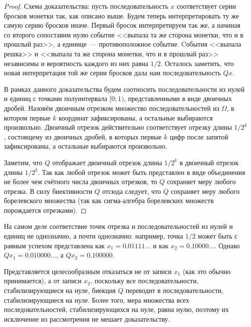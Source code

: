 \begin{proof}
	Схема доказательства:
	пусть последовательность $x$ соответствует серии бросков монетки так, как описано выше.
	Будем теперь интерпретировать ту же самую серию бросков иначе.
	Первый бросок интерпретируем так же,
	а начиная со второго сопоставим нулю событие <<выпала та же сторона монетки, что и в прошлый раз>>,
	а единице~--- противоположное событие.
	Cобытия <<выпала решка>> и <<выпала та же сторона монетки, что и в прошлый раз>> независимы
	и вероятность каждого из них равна $1/2$.
	Осталось заметить, что новая интерпретация той же серии бросков дала нам последовательность $Qx$.

	В рамках данного доказательства будем соотносить последовательности из нулей и единиц
	с точками полуинтервала $[0;1)$, представленными в виде двоичных дробей.
	Назовём двоичным отрезком множество последовательностей из $\Omega$,
	в котором первые $k$ координат зафиксированы, а остальные выбираются произвольно.
	Двоичный отрезок действительно соответствует отрезку длины $1/2^k$,
	состоящему из двоичных дробей, в которых первые $k$ цифр после запятой зафиксированы,
	а остальные выбираются произвольно.

	Заметим, что $Q$ отображает двоичный отрезок длины $1/2^k$ в двоичный отрезок длины $1/2^k$.
	Так как любой отрезок может быть представлен в виде объединения не более чем счётного числа
	двоичных отрезков, то $Q$ сохраняет меру любого отрезка.
	В силу биективности $Q$ отсюда следует, что $Q$ сохраняет меру любого борелевского множества
	(так как сигма-алгебра борелевских множеств порождается отрезками).
\end{proof}

\begin{remark}
	На самом деле соответствие точек отрезка и последовательностей из нулей и единиц не однозначно,
	а почти однозначно: например, точка $1/2$ может быть с равным успехом
	представлена как $x_1=0.01111...$ и как $x_2=0.10000...$.
	Однако $Qx_1 = 0.010000...$, а $Qx_2=0.100000$.



	Представляется целесообразным отказаться не от записи $x_1$ (как это обычно принимается),
	а от записи $x_2$, поскольку все последовательности, стабилизирующиеся на нуле,
	биекция $Q$ переводит в последовательности, стабилизирующиеся на нуле.
	Более того, мера множества всех последовательностей, стабилизирующихся на нуле, равна нулю,
	поэтому их исключение из рассмотрения не мешает доказательству.
\end{remark}

